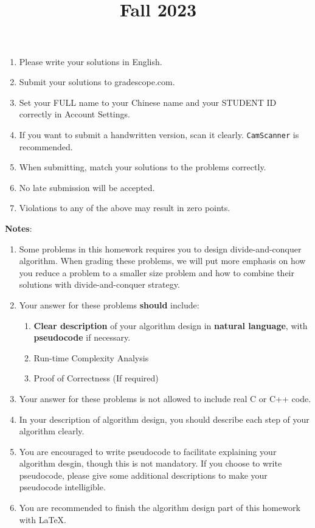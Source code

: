 \documentclass[11pt, addpoints, answers]{exam}
\title{
	\CourseName\\
	Fall 2023\\
	\HomeworkNO
}
\author{}
\date{\DueDate}
\newcommand{\ttt}{\texttt}
\begin{document}
\maketitle

\begin{enumerate}
	\item Please write your solutions in English.
	\item Submit your solutions to gradescope.com.
	\item Set your FULL name to your Chinese name and your STUDENT ID correctly in Account Settings.
	\item If you want to submit a handwritten version, scan it clearly. \ttt{CamScanner} is recommended.
	\item When submitting, match your solutions to the problems correctly.
	\item No late submission will be accepted.
	\item Violations to any of the above may result in zero points.
\end{enumerate}

\newpage

{\large\textbf{Notes}:}

\begin{enumerate}
	\item Some problems in this homework requires you to design divide-and-conquer algorithm. When grading these problems, we will put more emphasis on how you reduce a problem to a smaller size problem and how to combine their solutions with divide-and-conquer strategy. 
	\item Your answer for these problems {\color{red}\textbf{should}} include:
	\begin{enumerate}
		\item {\color{red} \textbf{Clear description} of your algorithm design in \textbf{natural language}, with \textbf{pseudocode} if necessary.}
		\item {\color{red}Run-time Complexity Analysis}
            \item {Proof of Correctness (If required)}
	\end{enumerate}
    \item Your answer for these problems is {\color{red}not allowed to include real C or C++ code}.
	\item In your description of algorithm design, you should describe each step of your algorithm clearly.
	\item You are encouraged to write pseudocode to facilitate explaining your algorithm desgin, though this is not mandatory. If you choose to write pseudocode, please give some additional descriptions to make your pseudocode intelligible.
	\item You are recommended to finish the algorithm design part of this homework with \LaTeX.
\end{enumerate}

\begin{questions}



\newpage



\newpage



\newpage



\newpage



\end{questions}
\end{document}
